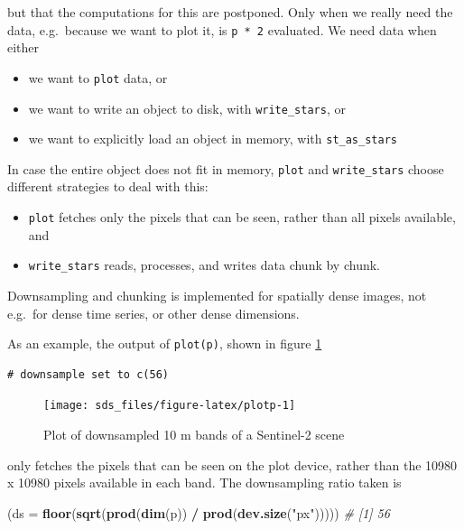 \documentclass[]{book}
\newenvironment{Shaded}{\begin{snugshade}}{\end{snugshade}}
\newcommand{\CommentTok}[1]{\textcolor[rgb]{0.56,0.35,0.01}{\textit{#1}}}
\newcommand{\DataTypeTok}[1]{\textcolor[rgb]{0.13,0.29,0.53}{#1}}
\newcommand{\KeywordTok}[1]{\textcolor[rgb]{0.13,0.29,0.53}{\textbf{#1}}}
\newcommand{\NormalTok}[1]{#1}
\newcommand{\OperatorTok}[1]{\textcolor[rgb]{0.81,0.36,0.00}{\textbf{#1}}}
\newcommand{\StringTok}[1]{\textcolor[rgb]{0.31,0.60,0.02}{#1}}
\providecommand{\tightlist}{%
  \setlength{\itemsep}{0pt}\setlength{\parskip}{0pt}}
\begin{document}
but that the computations for this are postponed. Only when we
really need the data, e.g.~because we want to plot it, is \texttt{p\ *\ 2} evaluated. We need data when either

\begin{itemize}
\tightlist
\item
  we want to \texttt{plot} data, or
\item
  we want to write an object to disk, with \texttt{write\_stars}, or
\item
  we want to explicitly load an object in memory, with \texttt{st\_as\_stars}
\end{itemize}

In case the entire object does not fit in memory, \texttt{plot} and
\texttt{write\_stars} choose different strategies to deal with this:

\begin{itemize}
\tightlist
\item
  \texttt{plot} fetches only the pixels that can be seen, rather than all
  pixels available, and
\item
  \texttt{write\_stars} reads, processes, and writes data chunk by chunk.
\end{itemize}

Downsampling and chunking is implemented for spatially dense images,
not e.g.~for dense time series, or other dense dimensions.

As an example, the output of \texttt{plot(p)}, shown in figure \ref{fig:plotp}

\begin{verbatim}
# downsample set to c(56)
\end{verbatim}

\begin{figure}

{\centering \texttt{[image: sds\_files/figure-latex/plotp-1]} 

}

\caption{Plot of downsampled 10 m bands of a Sentinel-2 scene}\label{fig:plotp}
\end{figure}

only fetches the pixels that can be seen on the plot device, rather
than the 10980 x 10980 pixels available in each band. The downsampling
ratio taken is

\begin{Shaded}
\begin{Highlighting}[]
\NormalTok{(}\DataTypeTok{ds =} \KeywordTok{floor}\NormalTok{(}\KeywordTok{sqrt}\NormalTok{(}\KeywordTok{prod}\NormalTok{(}\KeywordTok{dim}\NormalTok{(p)) }\OperatorTok{/}\StringTok{ }\KeywordTok{prod}\NormalTok{(}\KeywordTok{dev.size}\NormalTok{(}\StringTok{"px"}\NormalTok{)))))}
\CommentTok{# [1] 56}
\end{Highlighting}
\end{Shaded}
\end{document}
